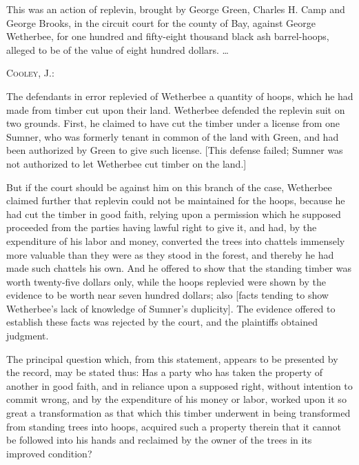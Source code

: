 
This was an action of replevin, brought by George Green, Charles H. Camp and
George Brooks, in the circuit court for the county of Bay, against George
Wetherbee, for one hundred and fifty-eight thousand black ash barrel-hoops,
alleged to be of the value of eight hundred dollars. \ldots

\opinion \textsc{Cooley}, J.:

The defendants in error replevied of Wetherbee a quantity of hoops, which he had
made from timber cut upon their land. Wetherbee defended the replevin suit on
two grounds. First, he claimed to have cut the timber under a license from one
Sumner, who was formerly tenant in common of the land with Green, and had been
authorized by Green to give such license. [This defense failed; Sumner was not
authorized to let Wetherbee cut timber on the land.]

But if the court should be against him on this branch of the case, Wetherbee
claimed further that replevin could not be maintained for the hoops, because he
had cut the timber in good faith, relying upon a permission which he supposed
proceeded from the parties having lawful right to give it, and had, by the
expenditure of his labor and money, converted the trees into chattels immensely
more valuable than they were as they stood in the forest, and thereby he had
made such chattels his own. And he offered to show that the standing timber was
worth twenty-five dollars only, while the hoops replevied were shown by the
evidence to be worth near seven hundred dollars; also [facts tending to show
Wetherbee's lack of knowledge of Sumner's duplicity]. The evidence offered to
establish these facts was rejected by the court, and the plaintiffs obtained
judgment.

The principal question which, from this statement, appears to be presented by
the record, may be stated thus: Has a party who has taken the property of
another in good faith, and in reliance upon a supposed right, without intention
to commit wrong, and by the expenditure of his money or labor, worked upon it
so great a transformation as that which this timber underwent in being
transformed from standing trees into hoops, acquired such a property therein
that it cannot be followed into his hands and reclaimed by the owner of the
trees in its improved condition?

